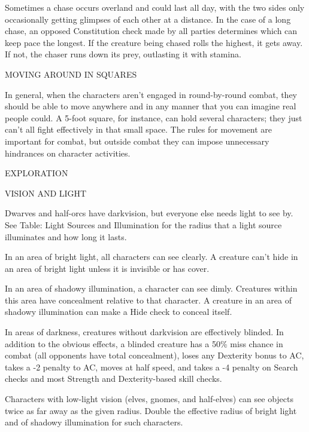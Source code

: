 \documentclass{article}
\begin{document}
Sometimes a chase occurs overland and could last all day, with the two sides only 
occasionally getting glimpses of each other at a distance. In the case of a long 
chase, an opposed Constitution check made by all parties determines which can keep 
pace the longest. If the creature being chased rolls the highest, it gets away. 
If not, the chaser runs down its prey, outlasting it with stamina.

\vspace{12pt}
{\large{}MOVING AROUND IN SQUARES}

In general, when the characters aren't engaged in round-by-round combat, they should 
be able to move anywhere and in any manner that you can imagine real people could. 
A 5-foot square, for instance, can hold several characters; they just can't all 
fight effectively in that small space. The rules for movement are important for 
combat, but outside combat they can impose unnecessary hindrances on character 
activities.

\vspace{12pt}
{\LARGE{}EXPLORATION}

\vspace{12pt}
VISION AND LIGHT

Dwarves and half-orcs have darkvision, but everyone else needs light to see by. 
See Table: Light Sources and Illumination for the radius that a light source illuminates 
and how long it lasts.

In an area of bright light, all characters can see clearly. A creature can't hide 
in an area of bright light unless it is invisible or has cover.

In an area of shadowy illumination, a character can see dimly. Creatures within 
this area have concealment relative to that character. A creature in an area of 
shadowy illumination can make a Hide check to conceal itself.

In areas of darkness, creatures without darkvision are effectively blinded. In 
addition to the obvious effects, a blinded creature has a 50\% miss chance in combat 
(all opponents have total concealment), loses any Dexterity bonus to AC, takes 
a -2 penalty to AC, moves at half speed, and takes a -4 penalty on Search checks 
and most Strength and Dexterity-based skill checks.

Characters with low-light vision (elves, gnomes, and half-elves) can see objects 
twice as far away as the given radius. Double the effective radius of bright light 
and of shadowy illumination for such characters.
\end{document}
